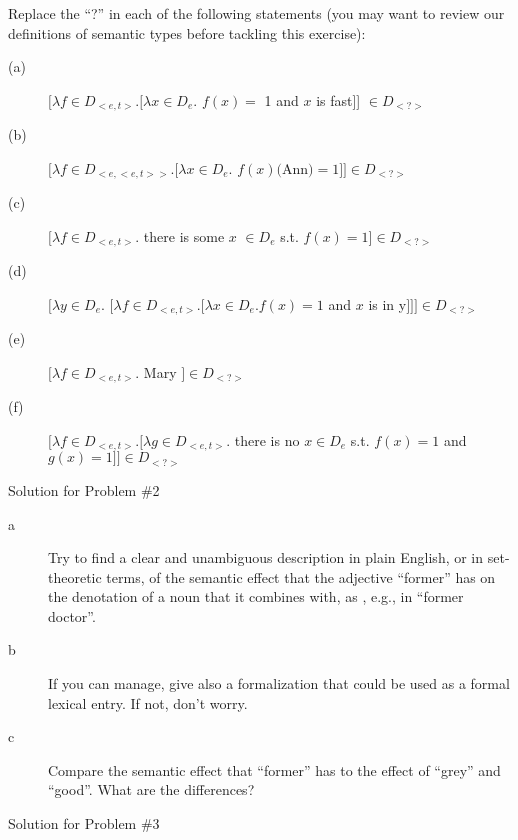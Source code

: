 \documentclass[11pt]{article}
\begin{document}
\begin{problem}{2}
Replace the ``?'' in each of the following statements (you may want to review our definitions of semantic types before tackling this exercise):

\begin{description}
    \item[(a)]$[\lambda f \in D_{<e,t>} . [\lambda x \in D_{e}.$ $f(x) =$ 1 and $x$ is fast]] $\in D_{<\textbf{?}>}$

    \item[(b)] $[\lambda f \in D_{<e,<e,t>>} . [\lambda x \in D_{e}.$ $f(x)($Ann$) = 1]] \in D_{<\textbf{?}>}$
    
    \item[(c)] $[\lambda f \in D_{<e,t>}.$ there is some $x$ $\in D_{e}$ s.t. $f(x) = 1] \in D_{<\textbf{?}>}$
    
    \item[(d)] $[\lambda y \in D_{e}.$ $[\lambda f \in D_{<e,t>} . [\lambda x \in D_{e}. f(x) =1$ and $x$ is in y$]]] \in D_{<\textbf{?}>}$
    
    \item[(e)] $[\lambda f \in D_{<e,t>}.$ Mary $] \in D_{<\textbf{?}>}$
    
    \item[(f)] $[\lambda f \in D_{<e,t>} . [\lambda g \in D_{<e,t>}.$ there is no $x \in D_{e}$ s.t. $f(x) = 1$ and $g(x) = 1]] \in D_{<\textbf{?}>}$

\end{description}

\end{problem}

\begin{solution}
Solution for Problem \#2
\end{solution}

\vspace*{0.5cm}

\begin{problem}{3}
\begin{description}
    \item[a] Try to find a clear and unambiguous description in plain English, or in set-theoretic terms, of the semantic effect that the adjective ``former'' has on the denotation of a noun that it combines with, as , e.g., in ``former doctor''.

    \item[b] If you can manage, give also a formalization that could be used as a formal lexical entry. If not, don't worry.

    \item[c] Compare the semantic effect that ``former'' has to the effect of ``grey'' and ``good''. What are the differences?
\end{description}
\end{problem}

\begin{solution}
Solution for Problem \#3
\end{solution}
\end{document}
